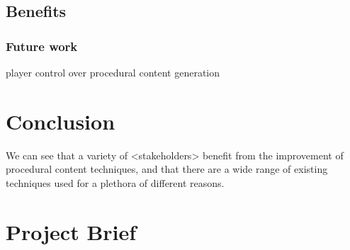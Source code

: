 \documentclass{./acm_proc_article-sp}
\begin{document}
\subsection{Benefits}
\subsubsection{Future work}
player control over procedural content generation

\section{Conclusion}
We can see that a variety of <stakeholders> benefit from the improvement of procedural content techniques, and that there are a wide range of existing techniques used for a plethora of different reasons.




\appendix
\section{Project Brief}
\balancecolumns
\end{document}
